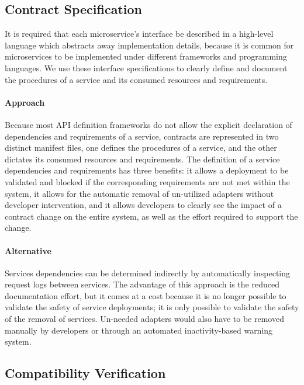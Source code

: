 \subsection{Contract Specification} %
\label{sec:contract_specification}

It is required that each microservice’s interface be
described in a high-level language which abstracts away implementation details, because it is common
for microservices to be implemented under different frameworks and programming languages.
We use these interface specifications to clearly define and document the procedures of a service and its consumed resources and requirements.

\paragraph{Approach}
Because most API definition frameworks do not allow the explicit declaration of dependencies and requirements of a service,
contracts are represented in two distinct manifest files, one defines the procedures of a service, and the other dictates its consumed resources and requirements.
The definition of a service dependencies and requirements has three benefits: it allows a deployment to be validated and blocked if the corresponding requirements are not met within the system,
it allows for the automatic removal of un-utilized adapters without developer intervention,
and it allows developers to clearly see the impact of a contract change on the entire system, as well as the effort required to support the change.

\paragraph{Alternative}
Services dependencies can be determined indirectly by automatically inspecting request logs between services.
The advantage of this approach is the reduced documentation effort, but it comes at a cost because
it is no longer possible to validate the safety of service deployments;
it is only possible to validate the safety of the removal of services.
Un-needed adapters would also have to be removed manually by developers or through an automated inactivity-based warning system.

\subsection{Compatibility Verification} %
\label{sec:compatibility_verification}

